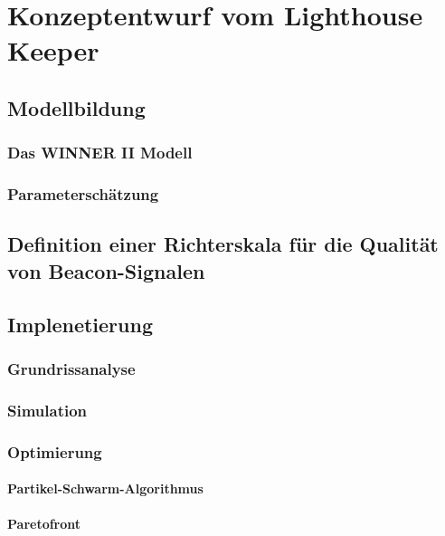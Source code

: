 \chapter{Konzeptentwurf vom Lighthouse Keeper}

\section{Modellbildung}
\subsection{Das WINNER II Modell}
\subsection{Parameterschätzung}

\section{Definition einer Richterskala für die Qualität von Beacon-Signalen}

\section{Implenetierung}
\subsection{Grundrissanalyse}
\subsection{Simulation}
\subsection{Optimierung}
\subsubsection{Partikel-Schwarm-Algorithmus}
\subsubsection{Paretofront}

